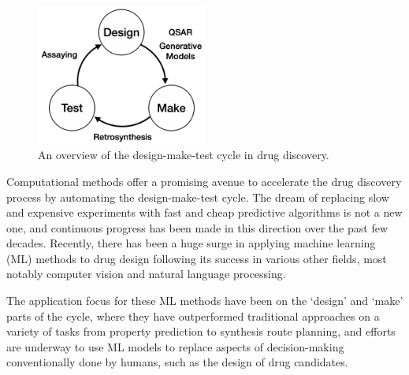 
\begin{figure}[!h] %
    \centering
    \includegraphics[width=0.5\textwidth]{Chapters/Intro/Figs/design-make-test.png}
    \caption{\label{fig:cycle} An overview of the design-make-test cycle in drug discovery.}
\end{figure}

Computational methods offer a promising avenue to accelerate the drug discovery process by automating the design-make-test cycle. The dream of replacing slow and expensive experiments with fast and cheap predictive algorithms is not a new one, and continuous progress has been made in this direction over the past few decades. Recently, there has been a huge surge in applying machine learning (ML) methods to drug design following its success in various other fields, most notably computer vision and natural language processing.

The application focus for these ML methods have been on the `design' and `make' parts of the cycle, where they have outperformed traditional approaches on a variety of tasks from property prediction to synthesis route planning, and efforts are underway to use ML models to replace aspects of decision-making conventionally done by humans, such as the design of drug candidates.

